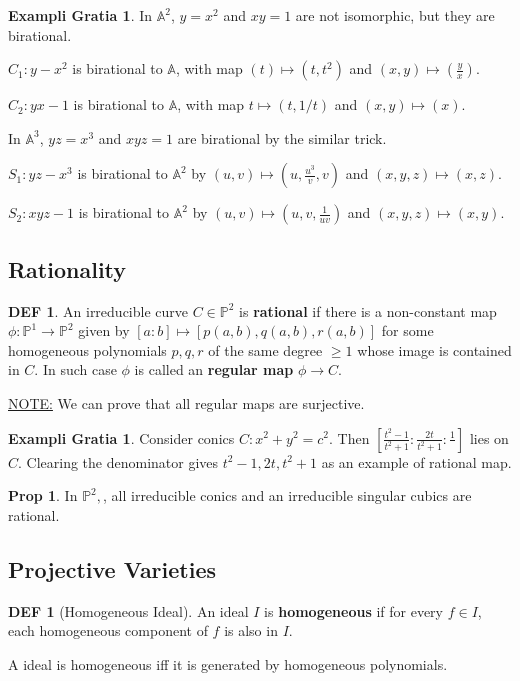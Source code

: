 \documentclass[twocolumn]{article}
\renewcommand{\emph}[1]{{\color{blue!70!black}\sffamily\bfseries #1}}
\newcommand{\A}{\mathbb{A}}
\renewcommand{\P}{\mathbb{P}}
\theoremstyle{definition}
\newtheorem{prop}[thm]{Prop}
\newtheorem{example}[thm]{Exampli Gratia}
\newtheorem{defi}[thm]{DEF}
\theoremstyle{remark}
\begin{document}
\begin{example}
	In $\A^2$, $y = x^2 $ and $xy = 1$ are not isomorphic, but they are birational.

	$C_1: y -x^2$ is birational to $\A$,
	with map $(t) \mapsto (t, t^2)$ and $(x, y) \mapsto (\frac{y}{x})$.

	$C_2: yx  - 1$ is birational to $\A$,
	with map $t \mapsto (t, 1/t)$ and $(x, y) \mapsto (x)$.

	In $\A^3$, $yz = x^3$ and $xyz = 1$ are birational by the similar trick.

	$S_1: yz - x^3$ is birational to $\A^2$ by $(u, v) \mapsto (u, \frac{u^3}{v}, v)$ and $(x,y,z) \mapsto (x, z)$.

	$S_2: xyz - 1$ is birational to $\A^2$ by $(u, v) \mapsto (u, v, \frac{1}{uv})$ and $(x,y,z) \mapsto (x, y)$.
\end{example}

\subsection{Rationality}

\begin{defi}
	An irreducible curve $C \in \P^2$ is \emph{rational} if there is a non-constant map $\phi: \P^1 \rightarrow \P^2$ given by $[a:b] \mapsto [p(a,b), q(a,b), r(a,b)]$ for some homogeneous polynomials $p, q, r$ of the same degree $\geq 1$ whose image is contained in $C$. 
	In such case $\phi$ is called an \emph{regular map} $\phi \rightarrow C$.
\end{defi}

\underline{NOTE:} We can prove that all regular maps are surjective.

\begin{example}
	Consider conics $C: x^2 + y^2 = c^2$. 
	Then 
	$ [\frac{t^2 - 1}{t^2 + 1}: \frac{2t}{t^2 + 1}: \frac{1}{}] $
	lies on $C$. 
	Clearing the denominator gives $t^2 -1,2t, t^2+1$ as an example of rational map.
\end{example}

\begin{prop}
	In $\P^2,$, all irreducible conics and an irreducible singular cubics are rational.
\end{prop}

\subsection{Projective Varieties}

\begin{defi}[Homogeneous Ideal]
	An ideal $I$ is \emph{homogeneous} if for every $f \in I$, each homogeneous component of $f$ is also in $I$.

	A ideal is homogeneous iff it is generated by homogeneous polynomials.
\end{defi}
\end{document}
